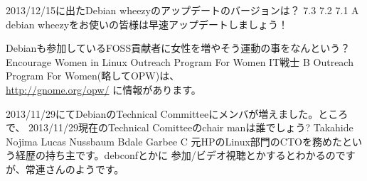%

\santaku
{2013/12/15に出たDebian wheezyのアップデートのバージョンは？}
{7.3}
{7.2}
{7.1}
{A}
{debian wheezyをお使いの皆様は早速アップデートしましょう！}

\santaku
{Debianも参加しているFOSS貢献者に女性を増やそう運動の事をなんという？}
{Encourage Women in Linux}
{Outreach Program For Women}
{IT戦士}
{B}
{Outreach Program For Women(略してOPW)は、\\
\url{http://gnome.org/opw/}
に情報があります。}

\santaku
{2013/11/29にてDebianのTechnical Committeeにメンバが増えました。ところで、
 2013/11/29現在のTechnical Comitteeのchair manは誰でしょう?}
{Takahide Nojima}
{Lucas Nussbaum}
{Bdale Garbee}
{C}
{元HPのLinux部門のCTOを務めたという経歴の持ち主です。debconfとかに
参加/ビデオ視聴とかするとわかるのですが、常連さんのようです。}

